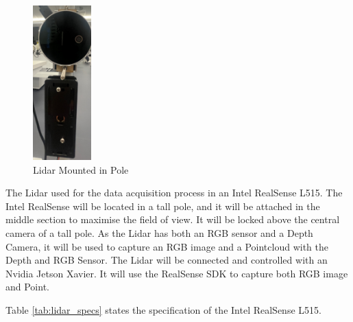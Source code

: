 \documentclass[12pt]{report}
\begin{document}
\begin{figure}
  \begin{center}
    \includegraphics[width=0.2\textwidth]{IMG_5886_cropped.jpg}
  \end{center}                          
  \caption{Lidar Mounted in Pole}
  \label{fig:lidar_mounted}
\end{figure}
The Lidar used for the data acquisition process in an Intel RealSense L515.
The Intel RealSense will be located in a tall pole, and it will be attached in the middle section to maximise the field of view. It will be locked above the central camera of a tall pole.
As the Lidar has both an RGB sensor and a Depth Camera, it will be used to capture an RGB image and a Pointcloud with the Depth and RGB Sensor.
The Lidar will be connected and controlled with an Nvidia Jetson Xavier. It will use the RealSense SDK to capture both RGB image and Point.

Table \ref{tab:lidar_specs} states the specification of the Intel RealSense L515. 
\end{document}
